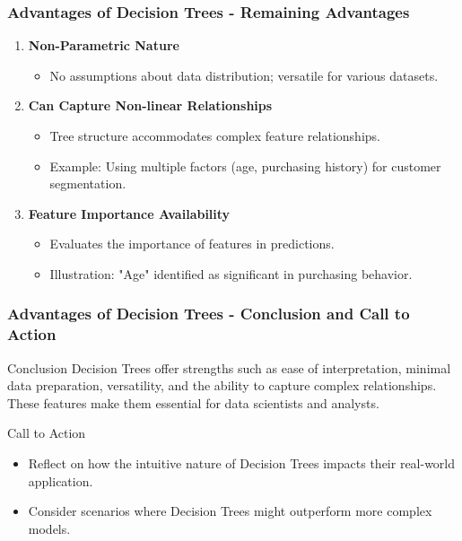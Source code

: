 \documentclass[aspectratio=169]{beamer}
\begin{document}
\begin{frame}[fragile]
    \frametitle{Advantages of Decision Trees - Remaining Advantages}
    \begin{enumerate}[resume]
        \item \textbf{Non-Parametric Nature}
            \begin{itemize}
                \item No assumptions about data distribution; versatile for various datasets.
            \end{itemize}
        \item \textbf{Can Capture Non-linear Relationships}
            \begin{itemize}
                \item Tree structure accommodates complex feature relationships.
                \item Example: Using multiple factors (age, purchasing history) for customer segmentation.
            \end{itemize}
        \item \textbf{Feature Importance Availability}
            \begin{itemize}
                \item Evaluates the importance of features in predictions.
                \item Illustration: "Age" identified as significant in purchasing behavior.
            \end{itemize}
    \end{enumerate}
\end{frame}

\begin{frame}[fragile]
    \frametitle{Advantages of Decision Trees - Conclusion and Call to Action}
    \begin{block}{Conclusion}
        Decision Trees offer strengths such as ease of interpretation, minimal data preparation, versatility, and the ability to capture complex relationships. These features make them essential for data scientists and analysts.
    \end{block}
    \begin{block}{Call to Action}
        \begin{itemize}
            \item Reflect on how the intuitive nature of Decision Trees impacts their real-world application.
            \item Consider scenarios where Decision Trees might outperform more complex models.
        \end{itemize}
    \end{block}
\end{frame}
\end{document}
